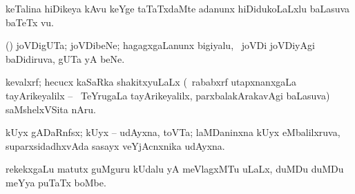 \bentry
{}
\gl{\nA}
\bmng
keTalina hiDikeya kAvu keYge taTaTxdaMte adanunx hiDidukoLaLxlu baLasuva baTeTx \mo vu. 
\emng
\eentry

\bentry
{}
\gl{\saMkiSx}
\bmng
{} 
\emng
\eentry

\bentry
{}
\gl{\nA}
\bmng
(\nw) joVDigUTa; joVDibeNe; hagagxgaLanunx bigiyalu, \sA\ joVDi joVDiyAgi baDidiruva, gUTa yA beNe. 
\emng
\eentry

\bentry
{}
\gl{\nA}
\expl{\P}
\bmng
kevalxrf; hecucx kaSaRka shakitxyuLaLx  (\kanmu\ rababxrf utapxnanxgaLa tayArikeyalilx -- \udA\ TeYrugaLa tayArikeyalilx, parxbalakArakavAgi baLasuva) saMshelxVSita nAru. 
\emng
\eentry

\bentry
{}
\gl{\nA}
\bmng
kUyx gADaRnfsx; kUyx -- udAyxna, toVTa; laMDaninxna kUyx eMbalilxruva, suparxsidadhxvAda sasayx veYjAcnxnika udAyxna. 
\emng
\eentry

\bentry
{}
\gl{\nA}
\bmng
rekekxgaLu matutx guMguru kUdalu yA meVlagxMTu uLaLx, duMDu duMDu meYya puTaTx boMbe. 
\emng
\eentry

